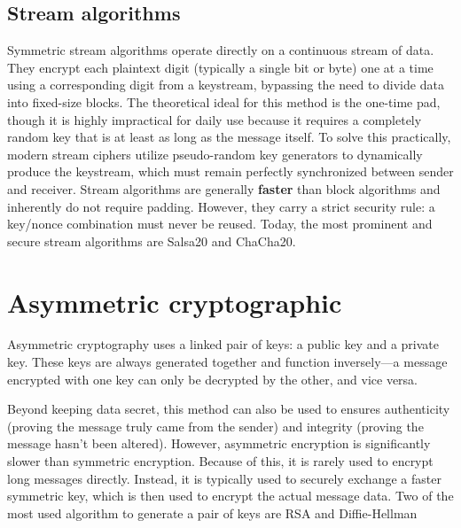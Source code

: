\subsection{Stream algorithms}
Symmetric stream algorithms operate directly on a continuous stream of data. They encrypt each plaintext digit (typically a single bit or byte) one at a time using a corresponding digit from a keystream, bypassing the need to divide data into fixed-size blocks.
The theoretical ideal for this method is the one-time pad, though it is highly impractical for daily use because it requires a completely random key that is at least as long as the message itself.
To solve this practically, modern stream ciphers utilize pseudo-random key generators to dynamically produce the keystream, which must remain perfectly synchronized between sender and receiver.
Stream algorithms are generally \textbf{faster} than block algorithms and inherently do not require padding. However, they carry a strict security rule: a key/nonce combination must never be reused.
Today, the most prominent and secure stream algorithms are Salsa20 and ChaCha20.



\section{Asymmetric cryptographic}

Asymmetric cryptography uses a linked pair of keys: a public key and a private key. These keys are always generated together and function inversely—a message encrypted with one key can only be decrypted by the other, and vice versa.

Beyond keeping data secret, this method can also be used to ensures authenticity (proving the message truly came from the sender) and integrity (proving the message hasn't been altered).
However, asymmetric encryption is significantly slower than symmetric encryption. Because of this, it is rarely used to encrypt long messages directly.
Instead, it is typically used to securely exchange a faster symmetric key, which is then used to encrypt the actual message data.
Two of the most used algorithm to generate a pair of keys are RSA and Diffie-Hellman

